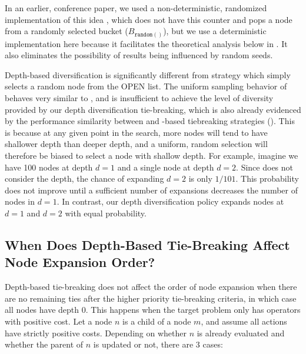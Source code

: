 In an earlier, conference paper, we used a non-deterministic,
randomized implementation of this idea \cite{Asai2016}, which does not have this counter and pops a node from a randomly selected bucket ($B_{\texttt{random}()}$), but we use a deterministic
implementation here because it facilitates the theoretical analysis below in . It also eliminates the possibility of results being influenced by random seeds.

Depth-based diversification is significantly different from \ro strategy which simply selects a random node from the OPEN list.
The uniform sampling behavior of  \ro behaves very similar to \fifo, and is insufficient to achieve the level of diversity provided by our depth diversification tie-breaking,
which is also already evidenced by the performance similarity between \fifo and \ro-based tiebreaking strategies ().
This is because at any given point in the search, more nodes will tend to have shallower depth than deeper depth, and a uniform, random selection will therefore be biased to select a node with shallow depth.
For example, imagine we have 100 nodes at depth $d=1$ and a single node at depth $d=2$.
Since \ro does not consider the depth, the chance of expanding $d=2$ is only $1/101$.
This probability does not improve until a sufficient number of expansions decreases the number of nodes in $d=1$.
In contrast, our depth diversification policy expands nodes at $d=1$ and $d=2$ with equal probability.



\subsection{When Does Depth-Based Tie-Breaking Affect Node Expansion Order?}
\label{sec:depth-and-nonzero-cost}

Depth-based tie-breaking does not affect the order of node expansion when there are no remaining ties after the
higher priority tie-breaking criteria, in which case all nodes have depth 0. 
% 
This happens when the target problem only has operators with positive cost.
Let a node $n$ is a child of a node $m$, and assume all actions have strictly positive costs. Depending on whether $n$ is already evaluated and whether the parent of $n$ is updated or not, there are 3 cases:

